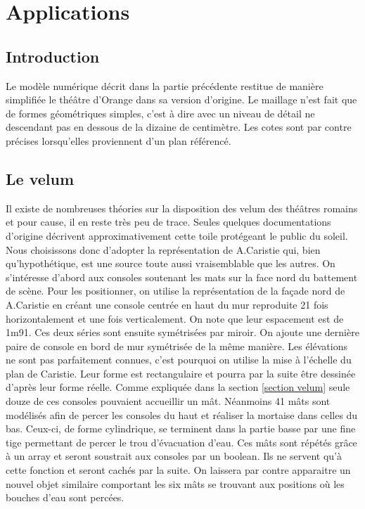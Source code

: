 		
		
		
		
		
		
		
		
		
		
		
\chapter{Applications}
	\minitoc
	\newpage

\section{Introduction}
Le modèle numérique décrit dans la partie précédente restitue de manière simplifiée le théâtre d'Orange dans sa version d'origine. Le maillage n'est fait que de formes géométriques simples, c'est à dire avec un niveau de détail ne descendant pas en dessous de la dizaine de centimètre. Les cotes sont par contre précises lorsqu'elles proviennent d'un plan référencé. 

\section{Le velum} \label{sect_velum}

Il existe de nombreuses théories sur la disposition des velum des théâtres romains et pour cause, il en reste très peu de trace. Seules quelques documentations d'origine  décrivent approximativement cette toile protégeant le public du soleil. Nous choisissons donc d'adopter la représentation de A.Caristie \cite[Pl. VI]{orangePl} qui, bien qu'hypothétique, est une source toute aussi vraisemblable que les autres. On s'intéresse d'abord aux consoles soutenant les mats sur la face nord du battement de scène. Pour les positionner, on utilise la représentation de la façade nord de A.Caristie \cite[Pl. III]{orangePl} en créant une console centrée en haut du mur reproduite 21 fois horizontalement et une fois verticalement. On note que leur espacement est de 1m91. Ces deux séries sont ensuite symétrisées par miroir. On ajoute une dernière paire de console en bord de mur symétrisée de la même manière. Les élévations ne sont pas parfaitement connues, c'est pourquoi on utilise la mise à l'échelle du plan de Caristie. Leur forme est rectangulaire et pourra par la suite être dessinée d'après leur forme réelle. Comme expliquée dans la section \ref{section velum} seule douze de ces consoles pouvaient accueillir un mât. Néanmoins 41 mâts sont modélisés afin de percer les consoles du haut et réaliser la mortaise dans celles du bas. Ceux-ci, de forme cylindrique, se terminent dans la partie basse par une fine tige permettant de percer le trou d'évacuation d'eau. Ces mâts sont répétés grâce à un \gls{array} et seront soustrait aux consoles par un \gls{boolean}. Ils ne servent qu'à cette fonction et seront cachés par la suite. On laissera par contre apparaitre un nouvel objet similaire comportant les six mâts se trouvant aux positions où les bouches d'eau sont percées. 

